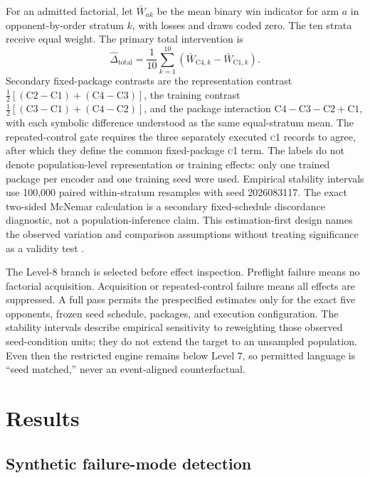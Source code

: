 \documentclass[aps,reprint,superscriptaddress,longbibliography,floatfix]{revtex4-2}
\newcommand{\COne}{\textsc{c1}}
\begin{document}
For an admitted factorial, let $\bar W_{ak}$ be the mean binary win indicator
for arm $a$ in opponent-by-order stratum $k$, with losses and draws coded zero.
The ten strata receive equal weight.  The primary total intervention is
\begin{equation}
 \widehat\Delta_{\mathrm{total}}=
 \frac{1}{10}\sum_{k=1}^{10}
 (\bar W_{\mathrm{C4},k}-\bar W_{\mathrm{C1},k}).
\end{equation}
Secondary fixed-package contrasts are the representation contrast
$\tfrac12[(\mathrm{C2}-\mathrm{C1})+(\mathrm{C4}-\mathrm{C3})]$, the training contrast
$\tfrac12[(\mathrm{C3}-\mathrm{C1})+(\mathrm{C4}-\mathrm{C2})]$, and the package
interaction $\mathrm{C4}-\mathrm{C3}-\mathrm{C2}+\mathrm{C1}$, with each symbolic
difference understood as the same equal-stratum mean.  The repeated-control gate
requires the three separately executed \COne{} records to agree, after which
they define the common fixed-package \COne{} term.  The labels do not denote
population-level representation or training effects: only one trained package
per encoder and one training seed were used.  Empirical stability intervals use
100,000 paired within-stratum resamples with seed 2026083117.  The exact
two-sided McNemar calculation is a secondary fixed-schedule discordance
diagnostic, not a population-inference claim.  This estimation-first design
names the observed variation and comparison assumptions without treating
significance as a validity test
\cite{patterson2024empirical,agarwal2021statistical}.

The Level-8 branch is selected before effect inspection.  Preflight failure
means no factorial acquisition.  Acquisition or repeated-control failure means
all effects are suppressed.  A full pass permits the prespecified estimates
only for the exact five opponents, frozen seed schedule, packages, and execution
configuration.  The stability intervals describe empirical sensitivity to
reweighting those observed seed-condition units; they do not extend the target
to an unsampled population.
Even then the restricted engine remains below Level 7, so permitted language is
``seed matched,'' never an event-aligned counterfactual.

\section{Results}

\subsection{Synthetic failure-mode detection}
\end{document}
